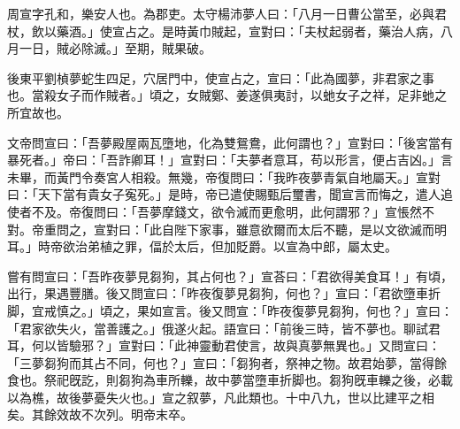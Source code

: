 \begin{pinyinscope}
 
 
 周宣字孔和，樂安人也。為郡吏。太守楊沛夢人曰：「八月一日曹公當至，必與君杖，飲以藥酒。」使宣占之。是時黃巾賊起，宣對曰：「夫杖起弱者，藥治人病，八月一日，賊必除滅。」至期，賊果破。
 
 
 
 
 後東平劉楨夢蛇生四足，穴居門中，使宣占之，宣曰：「此為國夢，非君家之事也。當殺女子而作賊者。」頃之，女賊鄭、姜遂俱夷討，以虵女子之祥，足非虵之所宜故也。
 
 
 
 
 文帝問宣曰：「吾夢殿屋兩瓦墮地，化為雙鴛鴦，此何謂也？」宣對曰：「後宮當有暴死者。」帝曰：「吾詐卿耳！」宣對曰：「夫夢者意耳，苟以形言，便占吉凶。」言未畢，而黃門令奏宮人相殺。無幾，帝復問曰：「我昨夜夢青氣自地屬天。」宣對曰：「天下當有貴女子寃死。」是時，帝已遣使賜甄后璽書，聞宣言而悔之，遣人追使者不及。帝復問曰：「吾夢摩錢文，欲令滅而更愈明，此何謂邪？」宣悵然不對。帝重問之，宣對曰：「此自陛下家事，雖意欲爾而太后不聽，是以文欲滅而明耳。」時帝欲治弟植之罪，偪於太后，但加貶爵。以宣為中郎，屬太史。
 
 
 
 
 嘗有問宣曰：「吾昨夜夢見芻狗，其占何也？」宣荅曰：「君欲得美食耳！」有頃，出行，果遇豐膳。後又問宣曰：「昨夜復夢見芻狗，何也？」宣曰：「君欲墮車折脚，宜戒慎之。」頃之，果如宣言。後又問宣：「昨夜復夢見芻狗，何也？」宣曰：「君家欲失火，當善護之。」俄遂火起。語宣曰：「前後三時，皆不夢也。聊試君耳，何以皆驗邪？」宣對曰：「此神靈動君使言，故與真夢無異也。」又問宣曰：「三夢芻狗而其占不同，何也？」宣曰：「芻狗者，祭神之物。故君始夢，當得餘食也。祭祀旣訖，則芻狗為車所轢，故中夢當墮車折脚也。芻狗旣車轢之後，必載以為樵，故後夢憂失火也。」宣之叙夢，凡此類也。十中八九，世以比建平之相矣。其餘效故不次列。明帝末卒。
 
 
\end{pinyinscope}